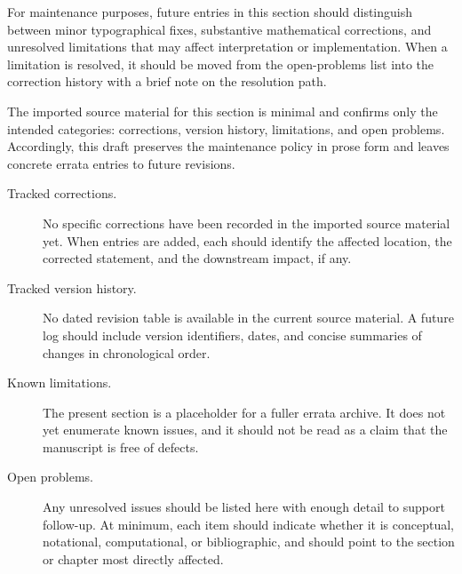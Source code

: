 \documentclass[11pt]{article}
\begin{document}
For maintenance purposes, future entries in this section should distinguish between minor typographical fixes, substantive mathematical corrections, and unresolved limitations that may affect interpretation or implementation. When a limitation is resolved, it should be moved from the open-problems list into the correction history with a brief note on the resolution path.

The imported source material for this section is minimal and confirms only the intended categories: corrections, version history, limitations, and open problems. Accordingly, this draft preserves the maintenance policy in prose form and leaves concrete errata entries to future revisions.

\begin{description}
  \item[Tracked corrections.] No specific corrections have been recorded in the imported source material yet. When entries are added, each should identify the affected location, the corrected statement, and the downstream impact, if any.

  \item[Tracked version history.] No dated revision table is available in the current source material. A future log should include version identifiers, dates, and concise summaries of changes in chronological order.

  \item[Known limitations.] The present section is a placeholder for a fuller errata archive. It does not yet enumerate known issues, and it should not be read as a claim that the manuscript is free of defects.

  \item[Open problems.] Any unresolved issues should be listed here with enough detail to support follow-up. At minimum, each item should indicate whether it is conceptual, notational, computational, or bibliographic, and should point to the section or chapter most directly affected.
\end{description}
\end{document}
